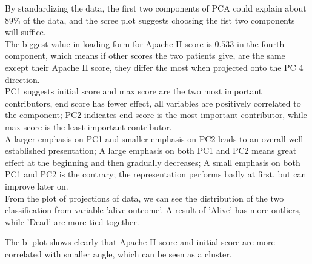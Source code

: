 \documentclass{article}
\begin{document}
By standardizing the data, the first two components of PCA \cite{Mishra} could explain about $89\%$ of the data, and the scree plot suggests choosing the fist two components will suffice.\\

The biggest value in loading form for Apache II score is $0.533$ in the fourth component, which means if other scores the two patients give, are the same except their Apache II score, they differ the most when projected onto the PC 4 direction. \\ 

PC1 suggests initial score and max score are the two most important contributors, end score has fewer effect, all variables are positively correlated to the component;  
PC2 indicates end score is the most important contributor, while max score is the least important contributor.  \\

A larger emphasis on PC1 and smaller emphasis on PC2 leads to an overall well established presentation; A large emphasis on both PC1 and PC2 means great effect at the beginning and then gradually decreases; A small emphasis on both PC1 and PC2 is the contrary; the representation performs badly at first, but can improve later on.\\

From the plot of projections of data, we can see the distribution of the two classification from variable 'alive outcome'. A result of 'Alive' has more outliers, while 'Dead' are more tied together.

The bi-plot shows clearly that Apache II score and initial score are more correlated with smaller angle, which can be seen as a cluster.


\begin{figure}[htp] 
    \centering
    \hfill%
\end{figure}
\end{document}
